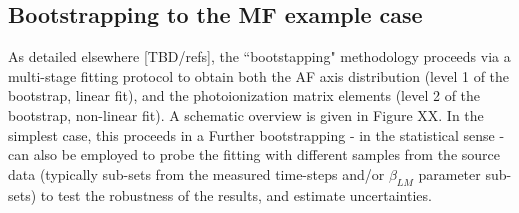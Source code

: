 \subsection{Bootstrapping to the MF example case}

As detailed elsewhere [TBD/refs], the ``bootstapping" methodology proceeds via a multi-stage fitting protocol to obtain both the AF axis distribution (level 1 of the bootstrap, linear fit), and the photoionization matrix elements (level 2 of the bootstrap, non-linear fit). A schematic overview is given in Figure XX. In the simplest case, this proceeds in a Further bootstrapping - in the statistical sense - can also be employed to probe the fitting with different samples from the source data (typically sub-sets from the measured time-steps and/or $\beta_{LM}$ parameter sub-sets) to test the robustness of the results, and estimate uncertainties.